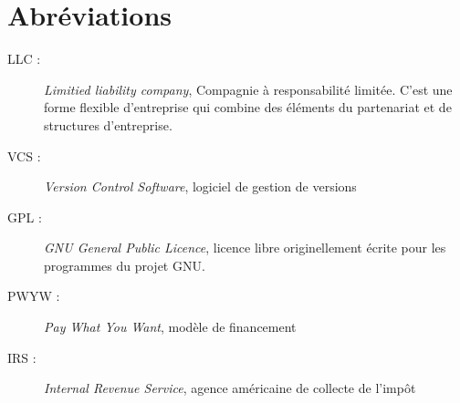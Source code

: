 \chapter*{Abréviations}

\begin{description}
    \item[LLC : ] \emph{Limitied liability company}, Compagnie à
        responsabilité limitée. C'est une forme flexible d'entreprise qui
        combine des éléments du partenariat et de structures d'entreprise.
    \item[VCS : ] \emph{Version Control Software}, logiciel de gestion de versions
    \item[GPL : ] \emph{GNU General Public Licence}, licence libre originellement
        écrite pour les programmes du projet GNU.
    \item[PWYW :] \emph{Pay What You Want}, modèle de financement
    \item[IRS :] \emph{Internal Revenue Service}, agence américaine de collecte de l'impôt
\end{description}
